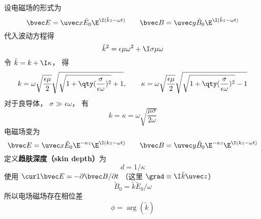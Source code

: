设电磁场的形式为
\begin{equation}
\bvec E = \uvec x \tilde E_0 \E^{\I (\tilde k z - \omega t)}
\qquad
\bvec B = \uvec y \tilde B_0 \E^{\I (\tilde k z - \omega t)}
\end{equation}
代入波动方程得
\begin{equation}
\tilde k^2 = \epsilon\mu \omega^2 + \I \sigma \mu \omega
\end{equation}
令 $\tilde k = k + \I \kappa$， 得
\begin{equation}
k = \omega\sqrt{\frac{\epsilon\mu}{2}} \sqrt{\sqrt{1 + \qty(\frac{\sigma}{\epsilon\omega})^2} + 1},
\qquad
\kappa = \omega\sqrt{\frac{\epsilon\mu}{2}} \sqrt{\sqrt{1 + \qty(\frac{\sigma}{\epsilon\omega})^2} - 1}
\end{equation}
对于良导体， $\sigma \gg \epsilon\omega$， 有
\begin{equation}
k = \kappa = \omega \sqrt{\frac{\mu\sigma}{2\omega}}
\end{equation}
电磁场变为
\begin{equation}
\bvec E = \uvec x \tilde E_0 \E^{-\kappa z} \E^{\I (kz - \omega t)}
\qquad
\bvec B = \uvec y \tilde B_0 \E^{-\kappa z} \E^{\I (kz - \omega t)}
\end{equation}
定义\textbf{趋肤深度（skin depth）}为
\begin{equation}
d = 1/\kappa
\end{equation}
使用 $\curl \bvec E = -\partial \bvec B / \partial t$ （这里 $\grad \equiv \I \tilde k \uvec z$）
\begin{equation}
\tilde B_0 = \tilde k \tilde E_0 / \omega
\end{equation}
所以电场磁场存在相位差
\begin{equation}
\phi = \arg (\tilde k)
\end{equation}
